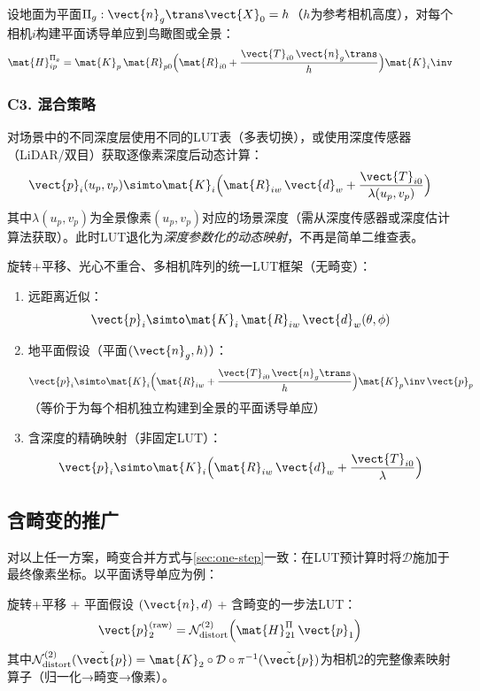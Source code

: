 设地面为平面$\Pi_g: \vect{n}_g\trans\vect{X}_0 = h$（$h$为参考相机高度），对每个相机$i$构建平面诱导单应到鸟瞰图或全景：
\begin{equation}
\mat{H}_{ip}^{\Pi_g} = \mat{K}_p\,\mat{R}_{p0}\Bigl(\mat{R}_{i0} + \frac{\vect{T}_{i0}\,\vect{n}_g\trans}{h}\Bigr)\mat{K}_i\inv
\label{eq:multi-ground}
\end{equation}

\subsubsection{C3. 混合策略}

对场景中的不同深度层使用不同的LUT表（多表切换），或使用深度传感器（LiDAR/双目）获取逐像素深度后动态计算：
\begin{equation}
\vect{p}_i(u_p,v_p) \simto
\mat{K}_i\Bigl(\mat{R}_{iw}\,\vect{d}_w + \frac{\vect{T}_{i0}}{\lambda(u_p,v_p)}\Bigr)
\label{eq:multi-depth}
\end{equation}
其中$\lambda(u_p,v_p)$为全景像素$(u_p,v_p)$对应的场景深度（需从深度传感器或深度估计算法获取）。此时LUT退化为\emph{深度参数化的动态映射}，不再是简单二维查表。

\begin{finalbox}
旋转+平移、光心不重合、多相机阵列的统一LUT框架（无畸变）：

\begin{enumerate}[leftmargin=*, label=(\arabic*)]
  \item 远距离近似：
  \[
  \vect{p}_i \simto \mat{K}_i\,\mat{R}_{iw}\,\vect{d}_w(\theta,\phi)
  \]
  \item 地平面假设（平面$(\vect{n}_g, h)$）：
  \[
  \vect{p}_i \simto \mat{K}_i\Bigl(\mat{R}_{iw} + \frac{\vect{T}_{i0}\,\vect{n}_g\trans}{h}\Bigr)\mat{K}_p\inv\,\vect{p}_p
  \]
  （等价于为每个相机独立构建到全景的平面诱导单应）
  \item 含深度的精确映射（非固定LUT）：
  \[
  \vect{p}_i \simto \mat{K}_i\Bigl(\mat{R}_{iw}\,\vect{d}_w + \frac{\vect{T}_{i0}}{\lambda}\Bigr)
  \]
\end{enumerate}
\end{finalbox}

\subsection{含畸变的推广}
\label{sec:rt-distort}

对以上任一方案，畸变合并方式与\cref{sec:one-step}一致：在LUT预计算时将$\mathcal{D}$施加于最终像素坐标。以平面诱导单应为例：

\begin{finalbox}
旋转+平移 + 平面假设 $(\vect{n}, d)$ + 含畸变的一步法LUT：
\[
\vect{p}_2^{\text{(raw)}} =
\mathcal{N}_{\text{distort}}^{(2)}\Bigl(
\mat{H}_{21}^{\Pi}\,\vect{p}_1
\Bigr)
\]
其中$\mathcal{N}_{\text{distort}}^{(2)}(\tilde{\vect{p}}) = \mat{K}_2 \circ \mathcal{D} \circ \pi^{-1}(\tilde{\vect{p}})$为相机2的完整像素映射算子（归一化→畸变→像素）。
\end{finalbox}
